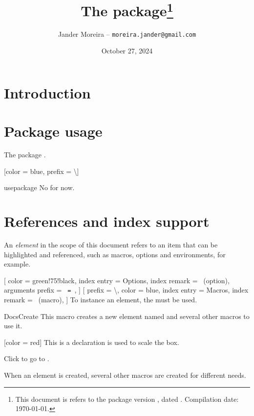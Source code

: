 \documentclass[11pt, outputdir = ./out]{article}
\title{The \PackageName{docs} package\footnote{This document is refers to the package version \DocsVersion, dated \DocsDate. Compilation date: \today.}}
\author{Jander Moreira -- \texttt{moreira.jander@gmail.com}}
\date{October 27, 2024}
\begin{document}
\maketitle

\tableofcontents


\section{Introduction}


\section{Package usage}
The package .

[color = blue, prefix = \textbackslash]
\begin{Package*}{usepackage}{}{}
    No  for now.
\end{Package*}


\section{References and index support}

An \textit{element} in the scope of this document refers to an item that can be highlighted and referenced, such as macros, options and environments, for example.

[
color = green!75!black,
index entry = Options,
index remark = {~(option)},
arguments prefix = \texttt{ = },
]
[
prefix = \textbackslash,
color = blue,
index entry = Macros,
index remark = {~(macro)},
]
To instance an element, the  must be used.

\begin{Macrodef}{DocsCreate}{}{}
    This macro creates a new element named  and several other macros to use it.

    \begin{example}{}
        [color = red]
        This is a declaration  is used to scale the box.

        Click to go to .
    \end{example}
\end{Macrodef}

When an element is created, several other macros are created for different needs.
\end{document}
